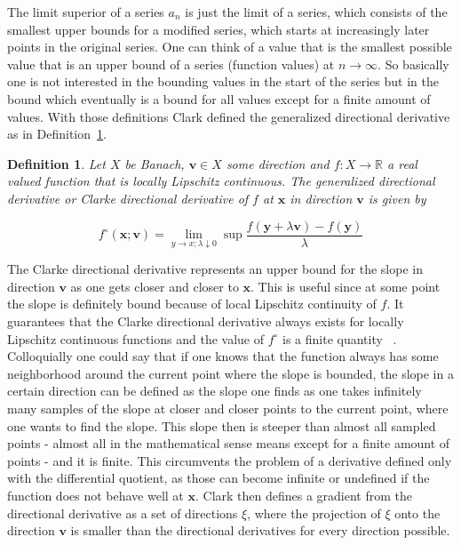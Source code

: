 \documentclass[a4paper,10pt]{article}
\newtheorem{definition}{Definition}
\renewcommand{\vec}[1]{\mathbf{#1}}
\newcommand{\defref}[1]{Definition~\ref{#1}}
\begin{document}
    The limit superior of a series $a_n$ is just the limit of a series, which consists
    of the smallest upper bounds for a modified series, which
    starts at increasingly later points in the original series.
    One can think of a value that is the smallest possible value that is
    an upper bound of a series (function values) at $n \rightarrow \infty$.
    So basically one is not interested in the bounding values in the start
    of the series but in the bound which eventually is a bound for all
    values except for a finite amount of values. 
    With those definitions Clark defined the generalized directional
    derivative as in \defref{def:generalized_deriv}.

    \begin{definition}
        \label{def:generalized_deriv}
        Let $X$ be Banach, $\vec{v} \in X$ some direction and 
        $f : X \rightarrow \mathbb{R}$ a real valued
        function that is locally Lipschitz continuous.
        The generalized directional derivative or Clarke directional
        derivative of $f$ at $\vec{x}$ in direction $\vec{v}$ is given by

        \begin{equation}
            f^{\circ}(\vec{x};\vec{v}) = 
            \lim_{y \rightarrow x; \lambda \downarrow 0} \sup
             \frac{f(\vec{y} + \lambda \vec{v}) - f(\vec{y})}{\lambda}
        \end{equation}

    \end{definition}

    The Clarke directional derivative represents an upper bound for the
    slope in direction $\vec{v}$ as one gets closer and closer to $\vec{x}$.
    This is useful since at some point the slope is definitely bound
    because of local Lipschitz continuity of $f$.
    It guarantees that the Clarke directional derivative always exists
    for locally Lipschitz continuous functions and the value of $f^{\circ}$
    is a finite quantity ~\cite{clarke}.
    Colloquially one could say that if one knows that the function always
    has some neighborhood around the current point where the slope is bounded,
    the slope in a certain direction can be defined as the slope
    one finds as one takes infinitely many samples of the slope at
    closer and closer points to the current point, where one wants
    to find the slope.
    This slope then is steeper than almost all sampled points - almost
    all in the mathematical sense means except for a finite amount of
    points - and it is finite.
    This circumvents the problem of a derivative defined only with
    the differential quotient, as those can become infinite or
    undefined if the function does not behave well at $\vec{x}$.
    Clark then defines a gradient from the directional derivative as
    a set of directions $\xi$, where the projection of $\xi$ onto
    the direction $\vec{v}$ is smaller than the directional
    derivatives for every direction possible.
    
\end{document}
